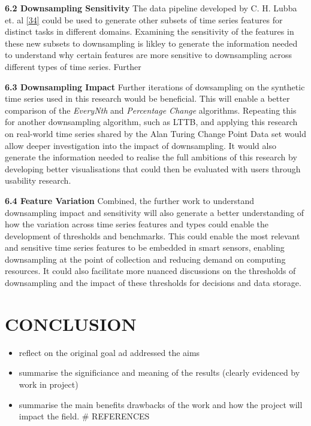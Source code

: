 \documentclass{article}
\providecommand{\tightlist}{%
  \setlength{\itemsep}{0pt}\setlength{\parskip}{0pt}}
\begin{document}
\textbf{6.2 Downsampling Sensitivity} The data pipeline developed by C.
H. Lubba et. al \protect\hyperlink{ref-catch22}{{[}34{]}} could be used
to generate other subsets of time series features for distinct tasks in
different domains. Examining the sensitivity of the features in these
new subsets to downsampling is likley to generate the information needed
to understand why certain features are more sensitive to downsampling
across different types of time series. Further

\textbf{6.3 Downsampling Impact} Further iterations of dowsampling on
the synthetic time series used in this research would be beneficial.
This will enable a better comparison of the \emph{EveryNth} and
\emph{Percentage Change} algorithms. Repeating this for another
downsampling algorithm, such as LTTB, and applying this research on
real-world time series shared by the Alan Turing Change Point Data set
would allow deeper investigation into the impact of downsampling. It
would also generate the information needed to realise the full ambitions
of this research by developing better visualisations that could then be
evaluated with users through usability research.

\textbf{6.4 Feature Variation} Combined, the further work to understand
downsampling impact and sensitivity will also generate a better
understanding of how the variation across time series features and types
could enable the development of thresholds and benchmarks. This could
enable the most relevant and sensitive time series features to be
embedded in smart sensors, enabling downsampling at the point of
collection and reducing demand on computing resources. It could also
facilitate more nuanced discussions on the thresholds of downsampling
and the impact of these thresholds for decisions and data storage.

\hypertarget{conclusion}{%
\section{CONCLUSION}\label{conclusion}}

\label{sec:headings}

\begin{itemize}
\tightlist
\item
  reflect on the original goal ad addressed the aims
\item
  summarise the significiance and meaning of the results (clearly
  evidenced by work in project)
\item
  summarise the main benefits drawbacks of the work and how the project
  will impact the field. \# REFERENCES \label{sec:headings}
\end{itemize}
\end{document}
